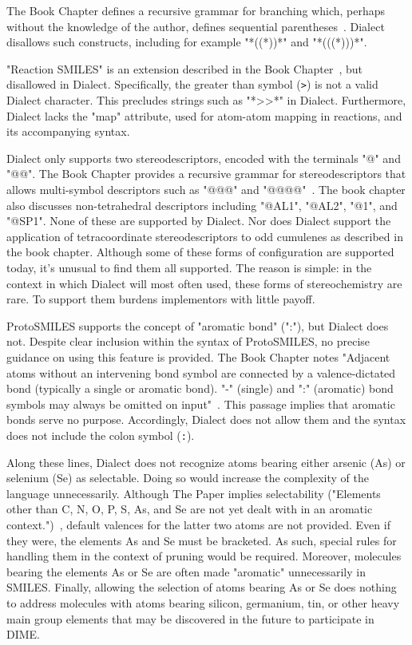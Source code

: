 \documentclass{article}
\def\ttt{\texttt}
\begin{document}
The Book Chapter defines a recursive grammar for branching which, perhaps without the knowledge of the author, defines sequential parentheses~\cite[p.~86]{weininger:2008}. Dialect disallows such constructs, including for example "*((*))*" and "*(((*)))*".

"Reaction SMILES" is an extension described in the Book Chapter~\cite[p.~89]{weininger:2008}, but disallowed in Dialect. Specifically, the greater than symbol (\ttt{>}) is not a valid Dialect character. This precludes strings such as "*>>*" in Dialect. Furthermore, Dialect lacks the "map" attribute, used for atom-atom mapping in reactions, and its accompanying syntax.

Dialect only supports two stereodescriptors, encoded with the terminals "@" and "@@". The Book Chapter provides a recursive grammar for stereodescriptors that allows multi-symbol descriptors such as "@@@" and "@@@@"~\cite[p.~94]{weininger:2008}. The book chapter also discusses non-tetrahedral descriptors including "@AL1", "@AL2", "@1", and "@SP1". None of these are supported by Dialect. Nor does Dialect support the application of tetracoordinate stereodescriptors to odd cumulenes as described in the book chapter. Although some of these forms of configuration are supported today, it's unusual to find them all supported. The reason is simple: in the context in which Dialect will most often used, these forms of stereochemistry are rare. To support them burdens implementors with little payoff.

ProtoSMILES supports the concept of "aromatic bond" (":"), but Dialect does not. Despite clear inclusion within the syntax of ProtoSMILES, no precise guidance on using this feature is provided. The Book Chapter notes "Adjacent atoms without an intervening bond symbol are connected by a valence-dictated bond (typically a single or aromatic bond). "-" (single) and ":" (aromatic) bond symbols may always be omitted on input"~\cite[p.~85]{weininger:2008}. This passage implies that aromatic bonds serve no purpose. Accordingly, Dialect does not allow them and the syntax does not include the colon symbol (\ttt{:}).

Along these lines, Dialect does not recognize atoms bearing either arsenic (As) or selenium (Se) as selectable. Doing so would increase the complexity of the language unnecessarily. Although The Paper implies selectability ("Elements other than C, N, O, P, S, As, and Se are not yet dealt with in an aromatic context.")~\cite[p.~35]{weininger:1988}, default valences for the latter two atoms are not provided. Even if they were, the elements As and Se must be bracketed. As such, special rules for handling them in the context of pruning would be required. Moreover, molecules bearing the elements As or Se are often made "aromatic" unnecessarily in SMILES. Finally, allowing the selection of atoms bearing As or Se does nothing to address molecules with atoms bearing silicon, germanium, tin, or other heavy main group elements that may be discovered in the future to participate in DIME.
\end{document}
